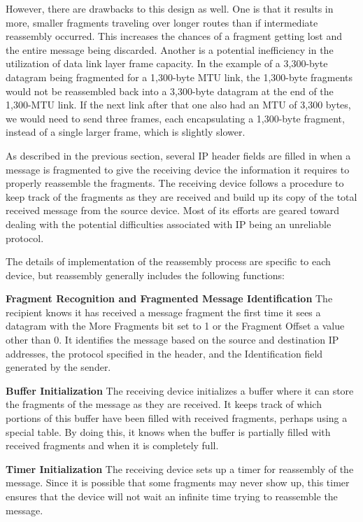 However, there are drawbacks to this design as well. One is that it
results in more, smaller fragments traveling over longer routes than if
intermediate reassembly occurred. This increases the chances of a
fragment getting lost and the entire message being discarded. Another is
a potential inefficiency in the utilization of data link layer frame
capacity. In the example of a 3,300-byte datagram being fragmented for a
1,300-byte MTU link, the 1,300-byte fragments would not be reassembled
back into a 3,300-byte datagram at the end of the 1,300-MTU link. If the
next link after that one also had an MTU of 3,300 bytes, we would need
to send three frames, each encapsulating a 1,300-byte fragment, instead
of a single larger frame, which is slightly slower.

As described in the previous section, several IP header fields are
filled in when a message is fragmented to give the receiving device the
information it requires to properly reassemble the fragments. The
receiving device follows a procedure to keep track of the fragments as
they are received and build up its copy of the total received message
from the source device. Most of its efforts are geared toward dealing
with the potential difficulties associated with IP being an unreliable
protocol.

The details of implementation of the reassembly process are specific to
each device, but reassembly generally includes the following functions:

{\textbf{Fragment Recognition and Fragmented Message Identification}}
The recipient knows it has received a message fragment the first time it
sees a datagram with the More Fragments bit set to 1 or the Fragment
Offset a value other than 0. It identifies the message based on the
source and destination IP addresses, the protocol specified in the
header, and the Identification field generated by the sender.

{\textbf{Buffer Initialization}} The receiving device initializes a
buffer where it can store the fragments of the message as they are
received. It keeps track of which portions of this buffer have been
filled with received fragments, perhaps using a special table. By doing
this, it knows when the buffer is partially filled with received
fragments and when it is completely full.

{\textbf{Timer Initialization}} The receiving device sets up a timer for
reassembly of the message. Since it is possible that some fragments may
never show up, this timer ensures that the device will not wait an
infinite time trying to reassemble the message.

